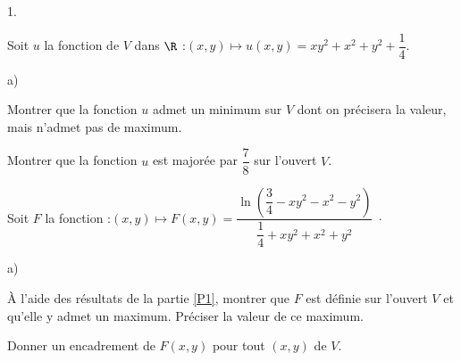 \documentclass[11pt]{article}%
\begin{document}
\begin{noliste}{1.}
 \setlength{\itemsep}{4mm}
\item Soit $u$ la fonction de $V$ dans $\R$ :\quad $(x,y)\mapsto
u(x,y) = xy^{2} + x^{2} + y^{2} + \dfrac{1}{4}$.

\begin{noliste}{a)}
 \setlength{\itemsep}{2mm}
\item Montrer que la fonction $u$ admet un minimum sur $V$ dont on
précisera la valeur, mais n'admet pas de maximum.

\item Montrer que la fonction $u$ est majorée par $\dfrac{7}{8}$ sur
l'ouvert $V$.
\end{noliste}

\item Soit $F$ la fonction :\qquad $ (x,y)\longmapsto F(x,y) =
\dfrac{\ln \left( \dfrac{3}{4}-xy^{2}-x^{2}-y^{2}\right) }{\dfrac{1}{4}
+ xy^{2} + x^{2} + y^{2}}\;\cdotp$

\begin{noliste}{a)}
 \setlength{\itemsep}{2mm}
\item \`{A} l'aide des résultats de la partie \ref{P1}, montrer que $F$
est définie sur l'ouvert $V$ et qu'elle y admet un maximum. Préciser
la valeur de ce maximum.

\item Donner un encadrement de $F(x,y)$ pour tout $(x,y)$ de $V$.
\end{noliste}
\end{noliste}

\label{derniere_{p}age}
\end{document}
